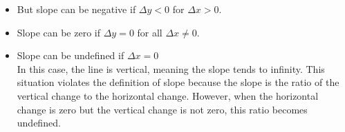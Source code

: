     \begin{itemize}
        \item But slope can be negative if $\Delta y < 0$ for $\Delta x > 0$.
            \begin{center}
            \end{center}

        \item Slope can be zero if $\Delta y = 0$ for all $\Delta x \neq 0$.
            \begin{center}
            \end{center}

        \item Slope can be undefined if $\Delta x = 0$\\
            In this case, the line is vertical, meaning the slope tends to infinity. This situation violates the definition of slope because the slope is the ratio of the vertical change to the horizontal change. However, when the horizontal change is zero but the vertical change is not zero, this ratio becomes undefined.
            \begin{center}
            \end{center}
    \end{itemize}
